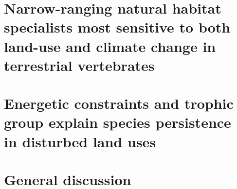 \documentclass[11pt]{report}
\renewcommand{\baselinestretch}{1.5}
\begin{document}
\begin{refsection}
\chapter{Narrow-ranging natural habitat specialists most sensitive to both land-use and climate change in terrestrial vertebrates}
\label{sec:4}


\chapter{Energetic constraints and trophic group explain species persistence in disturbed land uses}
\label{sec:5}


\chapter{General discussion}
\label{sec:6}


\clearpage
{}
{}
\renewcommand{\baselinestretch}{1}
\printbibliography[title={Bibliography}]
\clearpage

\end{refsection}
\end{document}
